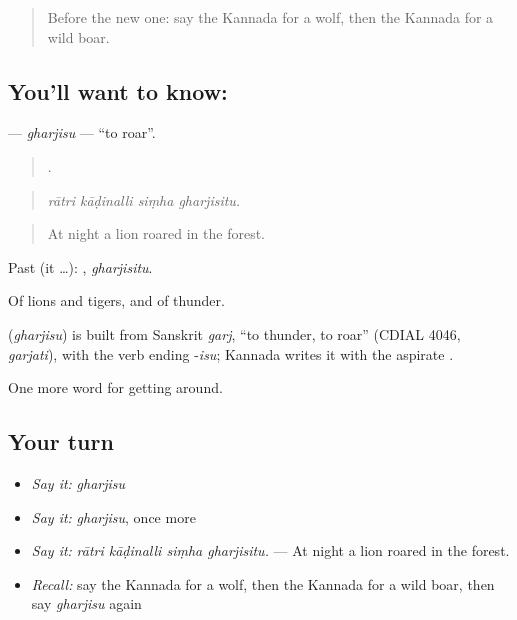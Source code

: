 \label{lesson:KA-C477-gharjisu}



\begin{quote}
Before the new one: say the Kannada for a wolf, then the Kannada for a wild boar.
\end{quote}

\subsection*{You'll want to know: }
\textbf{} — \emph{gharjisu} — \textquotedblleft{}to roar\textquotedblright{}.

\begin{quote}
   .
\end{quote}

\begin{quote}
\emph{rātri kāḍinalli siṃha gharjisitu.}
\end{quote}

\begin{quote}
At night a lion roared in the forest.
\end{quote}

Past (it …): , \emph{gharjisitu}.

Of lions and tigers, and of thunder.

\begin{cousinweb}
\textbf{} (\emph{gharjisu}) is built from Sanskrit \emph{garj}, \textquotedblleft{}to thunder, to roar\textquotedblright{} (CDIAL 4046, \emph{garjati}), with the verb ending -\emph{isu}; Kannada writes it with the aspirate .
\end{cousinweb}

\begin{grammarlens}[title={What you've built}]
One more word for getting around.
\end{grammarlens}

\subsection*{Your turn}
\begin{itemize}
\raggedright
  \item \emph{Say it:} \emph{gharjisu}
  \item \emph{Say it:} \emph{gharjisu}, once more
  \item \emph{Say it:} \emph{rātri kāḍinalli siṃha gharjisitu.} — At night a lion roared in the forest.
  \item \emph{Recall:} say the Kannada for a wolf, then the Kannada for a wild boar, then say \emph{gharjisu} again
\end{itemize}

